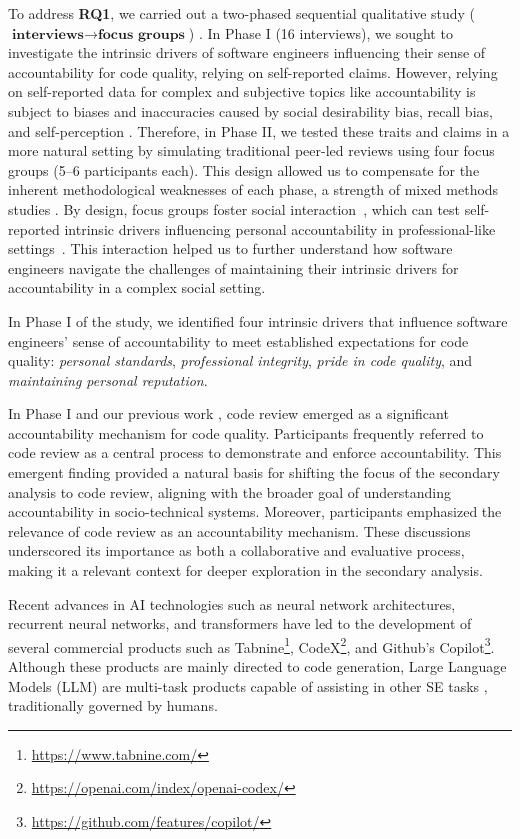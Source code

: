 To address \textbf{RQ1}, we carried out a two-phased sequential qualitative study ($\textbf{interviews} \rightarrow \textbf{focus groups}$) \citep{creswell2017designing}. In Phase I (16 interviews), we sought to investigate the intrinsic drivers of software engineers influencing their sense of accountability for code quality, relying on self-reported claims. However, relying on self-reported data for complex and subjective topics like accountability is subject to biases and inaccuracies caused by social desirability bias, recall bias, and self-perception \citep{podsakoff2003common}. Therefore, in Phase II, we tested these traits and claims in a more natural setting by simulating traditional peer-led reviews using four focus groups (5--6 participants each). This design allowed us to compensate for the inherent methodological weaknesses of each phase, a strength of mixed methods studies \citep{creswell2017designing}. By design, focus groups foster social interaction~\citep{Kontio2008}, which can test self-reported intrinsic drivers influencing personal accountability in professional-like settings~\citep{carroll2003making}. This interaction helped us to further understand how software engineers navigate the challenges of maintaining their intrinsic drivers for accountability in a complex social setting.

In Phase I of the study, we identified four intrinsic drivers that influence software engineers' sense of accountability to meet established expectations for code quality: \emph{personal standards}, \emph{professional integrity}, \emph{pride in code quality}, and \emph{maintaining personal reputation}.

In Phase I and our previous work \citep{alami2024understanding}, code review emerged as a significant accountability mechanism for code quality. Participants frequently referred to code review as a central process to demonstrate and enforce accountability. This emergent finding provided a natural basis for shifting the focus of the secondary analysis to code review, aligning with the broader goal of understanding accountability in socio-technical systems. Moreover, participants emphasized the relevance of code review as an accountability mechanism. These discussions underscored its importance as both a collaborative and evaluative process, making it a relevant context for deeper exploration in the secondary analysis.

Recent advances in AI technologies such as neural network architectures, recurrent neural networks, and transformers \cite{vaswani2017attention} have led to the development of several commercial products such as Tabnine\footnote{\url{https://www.tabnine.com/}}, CodeX\footnote{\url{https://openai.com/index/openai-codex/}}, and Github's Copilot\footnote{\url{https://github.com/features/copilot/}}. Although these products are mainly directed to code generation, Large Language Models (LLM) are multi-task products capable of assisting in other SE tasks \citep{fan2023large,lu2023llama}, traditionally governed by humans.

